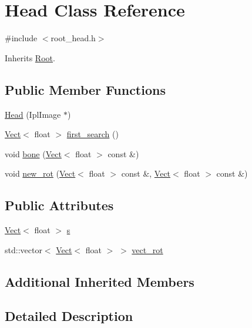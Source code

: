 \hypertarget{class_head}{\section{Head Class Reference}
\label{class_head}
}


{\ttfamily \#include $<$root\+\_\+head.\+h$>$}



Inherits \hyperlink{class_root}{Root}.

\subsection*{Public Member Functions}
\begin{DoxyCompactItemize}
\item 
\hyperlink{class_head_adfc085e2bd8b30c1b5928ab904097d28}{Head} (Ipl\+Image $\ast$)
\item 
\hyperlink{class_vect}{Vect}$<$ float $>$ \hyperlink{class_head_acd36132b35239c7aba79c6aa27ed4f59}{first\+\_\+search} ()
\item 
void \hyperlink{class_head_ac3926c50e5b94b6dda21946df2795291}{bone} (\hyperlink{class_vect}{Vect}$<$ float $>$ const \&)
\item 
void \hyperlink{class_head_ac5adc123ee3a25305f541d7c7a0331bc}{new\+\_\+rot} (\hyperlink{class_vect}{Vect}$<$ float $>$ const \&, \hyperlink{class_vect}{Vect}$<$ float $>$ const \&)
\end{DoxyCompactItemize}
\subsection*{Public Attributes}
\begin{DoxyCompactItemize}
\item 
\hyperlink{class_vect}{Vect}$<$ float $>$ \hyperlink{class_head_acaad3b8cc25b66a1eb630c0dc6fd6a1e}{s}
\item 
std\+::vector$<$ \hyperlink{class_vect}{Vect}$<$ float $>$ $>$ \hyperlink{class_head_a9a12abb26099e4a43f9976bd2094f81e}{vect\+\_\+rot}
\end{DoxyCompactItemize}
\subsection*{Additional Inherited Members}


\subsection{Detailed Description}


